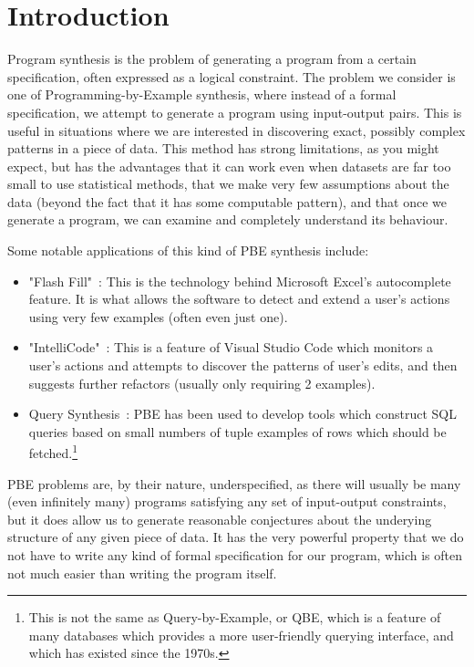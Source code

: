 \section{Introduction}

Program synthesis is the problem of generating a program from a certain specification, often expressed as a logical constraint. The problem we consider is one of Programming-by-Example synthesis, where instead of a formal specification, we attempt to generate a program using input-output pairs. This is useful in situations where we are interested in discovering exact, possibly complex patterns in a piece of data. This method has strong limitations, as you might expect, but has the advantages that it can work even when datasets are far too small to use statistical methods, that we make very few assumptions about the data (beyond the fact that it has some computable pattern), and that once we generate a program, we can examine and completely understand its behaviour.

Some notable applications of this kind of PBE synthesis include:

\begin{itemize}
  \item "Flash Fill"~\cite{gulwani2017program}: This is the technology behind Microsoft Excel's autocomplete feature. It is what allows the software to detect and extend a user's actions using very few examples (often even just one).
  \item "IntelliCode"~\cite{IntelliCode}: This is a feature of Visual Studio Code which monitors a user's actions and attempts to discover the patterns of user's edits, and then suggests further refactors (usually only requiring 2 examples).
  \item Query Synthesis~\cite{Shen2014DiscoveringQB}: PBE has been used to develop tools which construct SQL queries based on small numbers of tuple examples of rows which should be fetched.\footnote{This is not the same as Query-by-Example, or QBE, which is a feature of many databases which provides a more user-friendly querying interface, and which has existed since the 1970s.}
\end{itemize}

PBE problems are, by their nature, underspecified, as there will usually be many (even infinitely many) programs satisfying any set of input-output constraints, but it does allow us to generate reasonable conjectures about the underying structure of any given piece of data. It has the very powerful property that we do not have to write any kind of formal specification for our program, which is often not much easier than writing the program itself.

